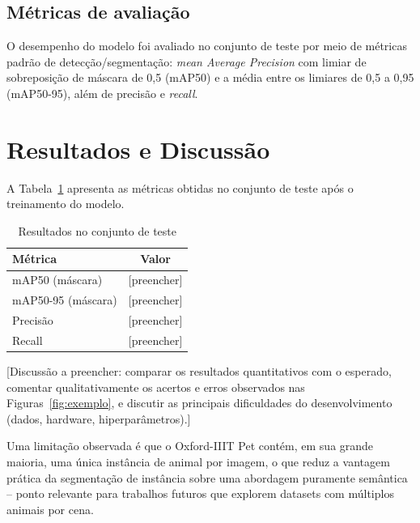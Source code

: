 \documentclass[12pt]{article}
\begin{document}
\subsection{Métricas de avaliação}

O desempenho do modelo foi avaliado no conjunto de teste por meio de métricas padrão de
detecção/segmentação: \textit{mean Average Precision} com limiar de sobreposição de máscara
de 0,5 (mAP50) e a média entre os limiares de 0,5 a 0,95 (mAP50-95), além de precisão e
\textit{recall}.


\section{Resultados e Discussão}
\label{sec:resultados}

A Tabela~\ref{tab:resultados} apresenta as métricas obtidas no conjunto de teste após o
treinamento do modelo.

\begin{table}[h]
\centering
\caption{Resultados no conjunto de teste}
\label{tab:resultados}
\begin{tabular}{lc}
\hline
\textbf{Métrica} & \textbf{Valor} \\
\hline
mAP50 (máscara)     & [preencher] \\
mAP50-95 (máscara)  & [preencher] \\
Precisão            & [preencher] \\
Recall               & [preencher] \\
\hline
\end{tabular}
\end{table}


[Discussão a preencher: comparar os resultados quantitativos com o esperado, comentar
qualitativamente os acertos e erros observados nas Figuras~\ref{fig:exemplo}, e discutir as
principais dificuldades do desenvolvimento (dados, hardware, hiperparâmetros).]

Uma limitação observada é que o Oxford-IIIT Pet contém, em sua grande maioria, uma única
instância de animal por imagem, o que reduz a vantagem prática da segmentação de instância
sobre uma abordagem puramente semântica -- ponto relevante para trabalhos futuros que
explorem datasets com múltiplos animais por cena.
\end{document}
